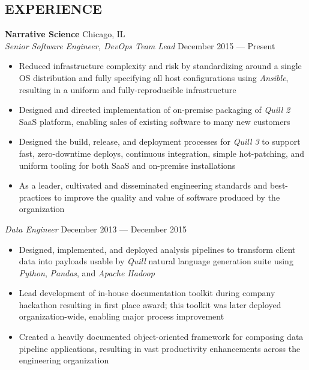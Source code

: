 \documentclass[line,margin]{res}
\begin{document}
\begin{resume}
\section{EXPERIENCE}
    \textbf{Narrative Science} \hfill Chicago, IL \\
    \textit{Senior Software Engineer, DevOps Team Lead}
    \hfill December 2015 --- Present
        \begin{itemize}  \itemsep -2pt
            \item Reduced infrastructure complexity and risk by standardizing
                around a single OS distribution and fully specifying all host
                configurations using \textit{Ansible}, resulting in a uniform
                and fully-reproducible infrastructure
            \item Designed and directed implementation of on-premise packaging
                of \textit{Quill 2} SaaS platform, enabling sales of existing
                software to many new customers
            \item Designed the build, release, and deployment processes for
                \textit{Quill 3} to support fast, zero-downtime deploys,
                continuous integration, simple hot-patching, and uniform
                tooling for both SaaS and on-premise installations
            \item As a leader, cultivated and disseminated engineering
                standards and best-practices to improve the quality and value
                of  software produced by the organization
        \end{itemize}
     \textit{Data Engineer} \hfill December 2013 --- December 2015
        \begin{itemize} \itemsep -2pt
            \item Designed, implemented, and deployed     analysis pipelines to
                transform client data into payloads usable by \textit{Quill}
                natural language generation suite using \textit{Python},
                \textit{Pandas}, and \textit{Apache Hadoop}
            \item Lead development of in-house documentation toolkit during
                company hackathon resulting in first place award; this toolkit
                was later deployed organization-wide, enabling major process
                improvement
            \item Created a heavily documented object-oriented framework for
                composing data pipeline applications, resulting in vast
                productivity enhancements across the engineering organization
        \end{itemize}


\end{resume}
\end{document}
